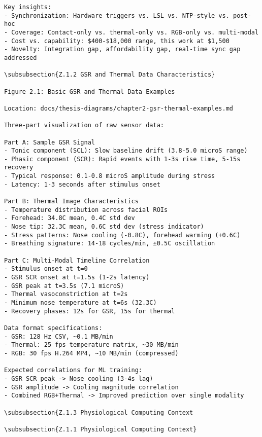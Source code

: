 \begin{verbatim}
Key insights:
- Synchronization: Hardware triggers vs. LSL vs. NTP-style vs. post-hoc
- Coverage: Contact-only vs. thermal-only vs. RGB-only vs. multi-modal
- Cost vs. capability: $400-$18,000 range, this work at $1,500
- Novelty: Integration gap, affordability gap, real-time sync gap addressed

\subsubsection{Z.1.2 GSR and Thermal Data Characteristics}

Figure 2.1: Basic GSR and Thermal Data Examples

Location: docs/thesis-diagrams/chapter2-gsr-thermal-examples.md

Three-part visualization of raw sensor data:

Part A: Sample GSR Signal
- Tonic component (SCL): Slow baseline drift (3.8-5.0 microS range)
- Phasic component (SCR): Rapid events with 1-3s rise time, 5-15s recovery
- Typical response: 0.1-0.8 microS amplitude during stress
- Latency: 1-3 seconds after stimulus onset

Part B: Thermal Image Characteristics
- Temperature distribution across facial ROIs
- Forehead: 34.8C mean, 0.4C std dev
- Nose tip: 32.3C mean, 0.6C std dev (stress indicator)
- Stress patterns: Nose cooling (-0.8C), forehead warming (+0.6C)
- Breathing signature: 14-18 cycles/min, ±0.5C oscillation

Part C: Multi-Modal Timeline Correlation
- Stimulus onset at t=0
- GSR SCR onset at t=1.5s (1-2s latency)
- GSR peak at t=3.5s (7.1 microS)
- Thermal vasoconstriction at t=2s
- Minimum nose temperature at t=6s (32.3C)
- Recovery phases: 12s for GSR, 15s for thermal

Data format specifications:
- GSR: 128 Hz CSV, ~0.1 MB/min
- Thermal: 25 fps temperature matrix, ~30 MB/min
- RGB: 30 fps H.264 MP4, ~10 MB/min (compressed)

Expected correlations for ML training:
- GSR SCR peak -> Nose cooling (3-4s lag)
- GSR amplitude -> Cooling magnitude correlation
- Combined RGB+Thermal -> Improved prediction over single modality

\subsubsection{Z.1.3 Physiological Computing Context

\subsubsection{Z.1.1 Physiological Computing Context}


\end{verbatim}
